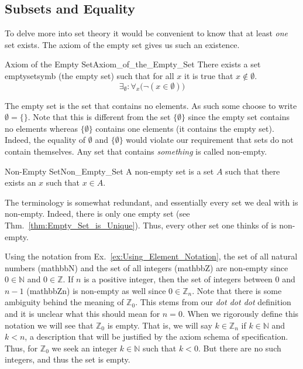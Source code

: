     \subsection{Subsets and Equality}
        To delve more into set theory it would be convenient to know that at
        least \textit{one} set exists. The axiom of the empty
        set gives us such an existence.
        \begin{faxiom}{Axiom of the Empty Set}{Axiom_of_the_Empty_Set}
            There exists a set \gls{emptysetsymb} (the \gls{empty set}) such
            that for all $x$ it is true that $x\notin\emptyset$.
            \begin{equation*}
                \exists_{\emptyset}:\forall_{x}\big(\neg(x\in\emptyset)\big)
            \end{equation*}
        \end{faxiom}
        The empty set is the set that contains no elements. As such some choose
        to write $\emptyset=\{\}$. Note that this is different from the
        set $\{\emptyset\}$ since the empty set contains no elements whereas
        $\{\emptyset\}$ contains one elements (it contains the empty set).
        Indeed, the equality of $\emptyset$ and $\{\emptyset\}$ would violate
        our requirement that sets do not contain themselves. Any set that
        contains \textit{something} is called non-empty.
        \begin{fdefinition}{Non-Empty Set}{Non_Empty_Set}
            A \gls{non-empty set} is a \gls{set} $A$ such that there exists an
            $x$ such that $x\in{A}$.
        \end{fdefinition}
        The terminology is somewhat redundant, and essentially every set we deal
        with is non-empty. Indeed, there is only one empty set
        (see Thm.~\ref{thm:Empty_Set_is_Unique}). Thus, every other set one
        thinks of is non-empty.
        \begin{example}
            Using the notation from Ex.~\ref{ex:Using_Element_Notation}, the set
            of all natural numbers (\gls{mathbbN}) and the set of all integers
            (\gls{mathbbZ}) are non-empty since $0\in\mathbb{N}$ and
            $0\in\mathbb{Z}$. If $n$ is a positive integer, then the set
            of integers between $0$ and $n-1$ (\gls{mathbbZn}) is non-empty as
            well since $0\in\mathbb{Z}_{n}$. Note that there is some ambiguity
            behind the meaning of $\mathbb{Z}_{0}$. This stems from our
            \textit{dot dot dot} definition and it is unclear what this should
            mean for $n=0$. When we rigorously define this notation we will see
            that $\mathbb{Z}_{0}$ is empty. That is, we will say
            $k\in\mathbb{Z}_{n}$ if $k\in\mathbb{N}$ and $k<n$, a description
            that will be justified by the axiom schema of
            specification. Thus, for
            $\mathbb{Z}_{0}$ we seek an integer $k\in\mathbb{N}$ such that
            $k<0$. But there are no such integers, and thus the set is empty.
        \end{example}
